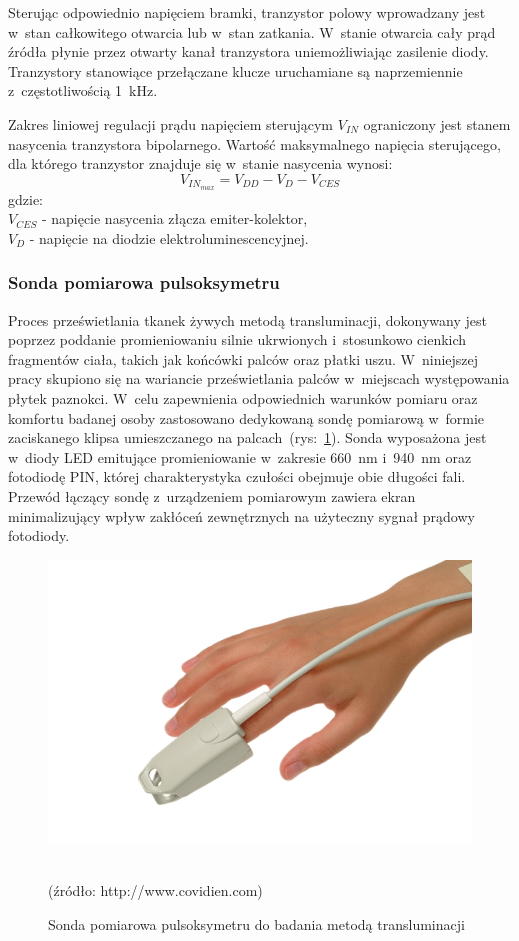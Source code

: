 Sterując odpowiednio napięciem bramki, tranzystor polowy wprowadzany jest w~stan całkowitego otwarcia lub w~stan zatkania. W~stanie otwarcia cały prąd źródła płynie przez otwarty kanał tranzystora 
uniemożliwiając zasilenie diody. Tranzystory stanowiące przełączane klucze uruchamiane są naprzemiennie z~częstotliwością 1~kHz. 

Zakres liniowej regulacji prądu napięciem sterującym $V_{IN}$ ograniczony jest stanem nasycenia tranzystora bipolarnego. Wartość maksymalnego napięcia sterującego, dla którego tranzystor 
znajduje się w~stanie nasycenia wynosi:
\begin{equation}
\label{equ:Saturation1}
	V_{IN_{max}} = V_{DD} - V_{D} - V_{CES}
\end{equation}
gdzie:\\
$V_{CES}$ - napięcie nasycenia złącza emiter-kolektor,\\
$V_{D}$ - napięcie na diodzie elektroluminescencyjnej. 

\subsubsection{Sonda pomiarowa pulsoksymetru}
\label{subsubsec:Sonda}

Proces prześwietlania tkanek żywych metodą transluminacji, dokonywany jest poprzez poddanie promieniowaniu silnie ukrwionych i~stosunkowo cienkich fragmentów ciała, takich jak końcówki palców oraz 
płatki uszu. W~niniejszej pracy skupiono się na wariancie prześwietlania palców w~miejscach występowania płytek paznokci. W~celu zapewnienia odpowiednich warunków pomiaru oraz komfortu badanej osoby 
zastosowano dedykowaną sondę pomiarową w~formie zaciskanego klipsa umieszczanego na palcach~(rys:~\ref{rys:Sonda}).
Sonda wyposażona jest w~diody LED emitujące promieniowanie w~zakresie 660~nm i~940~nm oraz fotodiodę PIN, której charakterystyka czułości obejmuje obie długości fali. Przewód łączący sondę z~urządzeniem
pomiarowym zawiera ekran minimalizujący wpływ zakłóceń zewnętrznych na użyteczny sygnał prądowy fotodiody.
\begin{figure}[ht]
	\centerline{\includegraphics[scale = 0.45]{graphic/sensor}}
	\caption{Sonda pomiarowa pulsoksymetru do badania metodą transluminacji}
	~\\
	(źródło: http://www.covidien.com)
	\label{rys:Sonda}
\end{figure}

